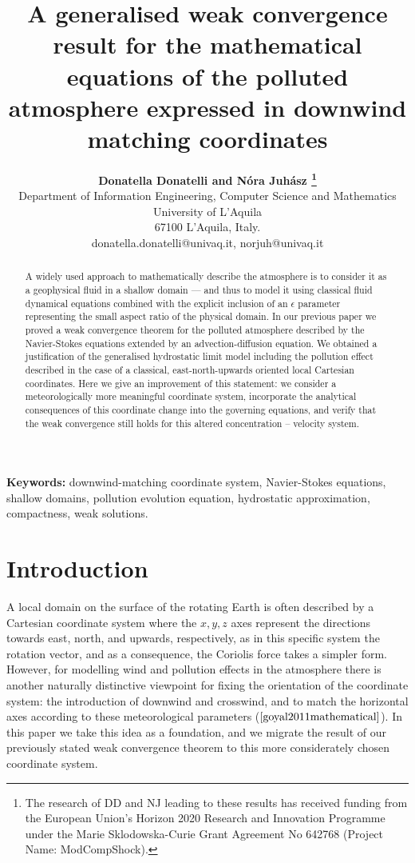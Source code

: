 \documentclass[11pt]{article}
\title{A generalised weak convergence result for the mathematical equations of the polluted atmosphere expressed in downwind matching coordinates}
\author{
  \large{\bf{Donatella Donatelli} and \bf{N\'ora Juh\'asz}
  \thanks{The research of DD and NJ leading to these results has received funding from the European Union's Horizon 2020 Research and Innovation Programme under the Marie Sklodowska-Curie Grant Agreement No 642768 (Project Name: ModCompShock).}} \\[1ex]
  \normalsize Department of Information Engineering, Computer Science and Mathematics \\
  \normalsize University of L'Aquila \\
  \normalsize 67100 L'Aquila, Italy. \\
  \normalsize {donatella.donatelli@univaq.it},  {norjuh@univaq.it}
}
\date{}
\begin{document}
\maketitle

\begin{abstract}

A widely used approach to mathematically describe the atmosphere is to consider it as a geophysical fluid in a shallow domain --- and thus to model it using classical fluid dynamical equations combined with the explicit inclusion of an $\epsilon$ parameter representing the small aspect ratio of the physical domain. In our previous paper we proved a weak convergence theorem for the polluted atmosphere described by the Navier-Stokes equations extended by an advection-diffusion equation. We obtained a justification of the generalised hydrostatic limit model including the pollution effect described in the case of a classical, east-north-upwards oriented local Cartesian coordinates. Here we give an improvement of this statement: we consider a meteorologically more meaningful coordinate system, incorporate the analytical consequences of this coordinate change into the governing equations, and verify that the weak convergence still holds for this altered concentration -- velocity system.

\end{abstract}

{\bf Keywords:} downwind-matching coordinate system, Navier-Stokes equations, shallow domains, pollution evolution equation, hydrostatic approximation, compactness, weak solutions.

\newpage

\tableofcontents
\newpage

\section{Introduction} \label{Introduction}

A local domain on the surface of the rotating Earth is often described by a Cartesian coordinate system where the $x, y, z$ axes represent the directions towards east, north, and upwards, respectively, as in this specific system the rotation vector, and as a consequence, the Coriolis force takes a simpler form. However, for modelling wind and pollution effects in the atmosphere there is another naturally distinctive viewpoint for fixing the orientation of the coordinate system: the introduction of downwind and crosswind, and to match the horizontal axes according to these meteorological parameters ($\cite{goyal2011mathematical}$). In this paper we take this idea as a foundation, and we migrate the result of our previously stated weak convergence theorem to this more considerately chosen coordinate system.
\end{document}
